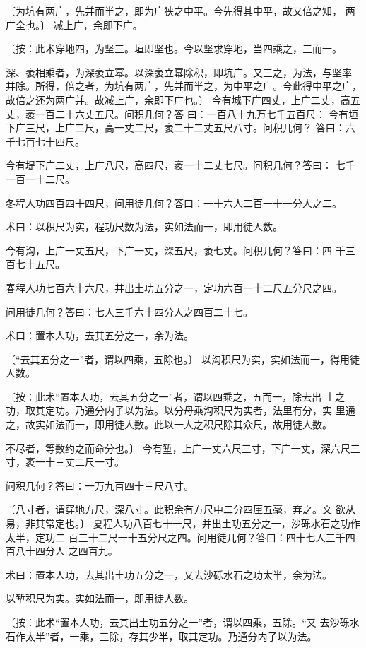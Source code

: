 \documentclass[a4paper,12pt,UTF8,twoside]{ctexbook}
\begin{document}
〔为坑有两广，先并而半之，即为广狭之中平。今先得其中平，故又倍之知， 两广全也。〕 减上广，余即下广。

〔按：此术穿地四，为坚三。垣即坚也。今以坚求穿地，当四乘之，三而一。

深、袤相乘者，为深袤立幂。以深袤立幂除积，即坑广。又三之，为法，与坚率 并除。所得，倍之者，为坑有两广，先并而半之，为中平之广。今此得中平之广， 故倍之还为两广并。故减上广，余即下广也。〕 今有城下广四丈，上广二丈，高五丈，袤一百二十六丈五尺。问积几何？答 曰：一百八十九万七千五百尺： 今有垣下广三尺，上广二尺，高一丈二尺，袤二十二丈五尺八寸。问积几何？ 答曰：六千七百七十四尺。

今有堤下广二丈，上广八尺，高四尺，袤一十二丈七尺。问积几何？答曰： 七千一百一十二尺。

冬程人功四百四十四尺，问用徒几何？答曰：一十六人二百一十一分人之二。

术曰：以积尺为实，程功尺数为法，实如法而一，即用徒人数。

今有沟，上广一丈五尺，下广一丈，深五尺，袤七丈。问积几何？答曰：四 千三百七十五尺。

春程人功七百六十六尺，并出土功五分之一，定功六百一十二尺五分尺之四。

问用徒几何？答曰：七人三千六十四分人之四百二十七。

术曰：置本人功，去其五分之一，余为法。

〔“去其五分之一”者，谓以四乘，五除也。〕 以沟积尺为实，实如法而一，得用徒人数。

〔按：此术“置本人功，去其五分之一”者，谓以四乘之，五而一，除去出 土之功，取其定功。乃通分内子以为法。以分母乘沟积尺为实者，法里有分，实 里通之，故实如法而一，即用徒人数。此以一人之积尺除其众尺，故用徒人数。

不尽者，等数约之而命分也。〕 今有堑，上广一丈六尺三寸，下广一丈，深六尺三寸，袤一十三丈二尺一寸。

问积几何？答曰：一万九百四十三尺八寸。

〔八寸者，谓穿地方尺，深八寸。此积余有方尺中二分四厘五毫，弃之。文 欲从易，非其常定也。〕 夏程人功八百七十一尺，并出土功五分之一，沙砾水石之功作太半，定功二 百三十二尺一十五分尺之四。问用徒几何？答曰：四十七人三千四百八十四分人 之四百九。

术曰：置本人功，去其出土功五分之一，又去沙砾水石之功太半，余为法。

以堑积尺为实。实如法而一，即用徒人数。

〔按：此术“置本人功，去其出土功五分之一”者，谓以四乘，五除。“又 去沙砾水石作太半”者，一乘，三除，存其少半，取其定功。乃通分内子以为法。
\end{document}
